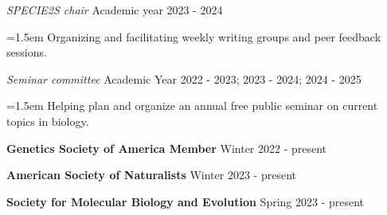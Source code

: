 \documentclass[11pt]{extarticle}
\begin{document}
\vspace{1mm}
\textit{SPECIE2S chair} \hfill Academic year 2023 - 2024 \par
{\narrower \hangindent=1.5em {Organizing and facilitating weekly writing groups and peer feedback sessions.} \normalsize \par }
\vspace{2.5mm}
\vspace{1mm}
\textit{Seminar committee} \hfill Academic Year 2022 - 2023; 2023 - 2024; 2024 - 2025 \par
{\narrower \hangindent=1.5em {Helping plan and organize an annual free public seminar on current topics in biology.} \normalsize \par }
\vspace{2.5mm}
\noindent \textbf{Genetics Society of America Member} \hfill Winter 2022 - present \par
\vspace{2.5mm}
\noindent \textbf{American Society of Naturalists} \hfill Winter 2023 - present \par
\vspace{2.5mm}
\noindent \textbf{Society for Molecular Biology and Evolution} \hfill Spring 2023 - present \par
\end{document}
